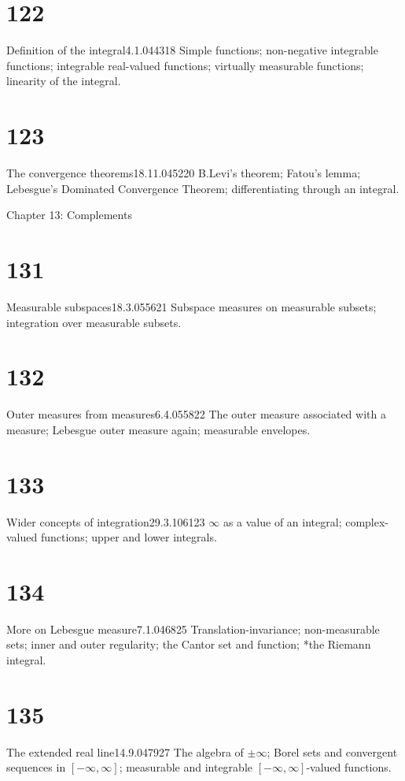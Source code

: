 \section{122}{Definition of the integral}{4.1.04}{43}{18}
{Simple functions;  non-negative integrable functions;  integrable
real-valued functions;  virtually measurable functions;  linearity of
the integral.}

\section{123}{The convergence theorems}{18.11.04}{52}{20}
{B.Levi's theorem;  Fatou's lemma;  Lebesgue's Dominated
Convergence Theorem;  differentiating through an integral.}

\medskip

 Chapter 13:  Complements


\section{131}{Measurable subspaces}{18.3.05}{56}{21}
{Subspace measures on measurable subsets;  integration over
measurable subsets.}

\section{132}{Outer measures from measures}{6.4.05}{58}{22}
{The outer measure associated with a measure;  Lebesgue outer
measure again;  measurable envelopes.}

\section{133}{Wider concepts of integration}{29.3.10}{61}{23}
{$\infty$ as a value of an integral;  complex-valued functions;
upper and lower integrals.}

\section{134}{More on Lebesgue measure}{7.1.04}{68}{25}
{Translation-invariance;  non-measurable sets;  inner and outer
regularity;  the Cantor set and function;  *the Riemann integral.}

\section{135}{The extended real line}{14.9.04}{79}{27}
{The algebra of $\pm\infty$;  Borel sets and convergent sequences
in $[-\infty,\infty]$;   measurable and integrable
$[-\infty,\infty]$-valued functions.}

